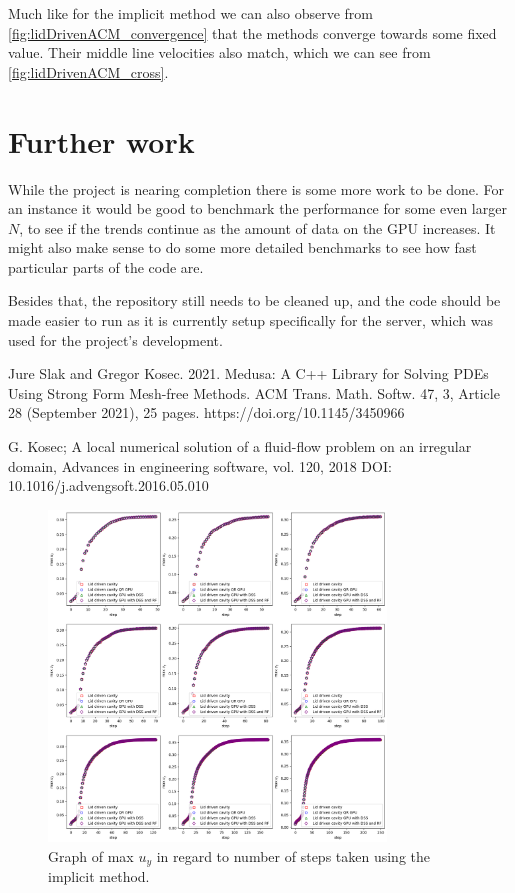 \documentclass{article}
\begin{document}
Much like for the implicit method we can also observe from \ref{fig:lidDrivenACM_convergence} that 
the methods converge towards some fixed value. Their middle line velocities also match, which we can 
see from \ref{fig:lidDrivenACM_cross}.

\section{Further work}
While the project is nearing completion there is some more work to be done. For an instance it 
would be good to benchmark the performance for some even larger \(N\), to see if the trends continue
as the amount of data on the GPU increases. It might also make sense to do some more detailed 
benchmarks to see how fast particular parts of the code are.

Besides that, the repository still needs to be cleaned up, and the code should be made easier to run
as it is currently setup specifically for the server, which was used for the project's development. 
\begin{thebibliography}{99}
     Jure Slak and Gregor Kosec. 2021. Medusa: A C++ Library
    for Solving PDEs Using Strong Form Mesh-free Methods. ACM Trans. Math. Softw. 47,
    3, Article 28 (September 2021), 25 pages. https://doi.org/10.1145/3450966

     G. Kosec; A local numerical solution of a fluid-flow problem
    on an irregular domain, Advances in engineering software, vol. 120, 2018
    DOI: 10.1016/j.advengsoft.2016.05.010
\end{thebibliography}
\begin{figure}[h!] 
    \centering 
    \includegraphics[width=0.8\textwidth]{lidDriven_convergence.png} 
    \caption{Graph of max $u_y$ in regard to number of steps taken using the implicit method.} 
    \label{fig:lidDriven_convergence} 
\end{figure}
\end{document}
